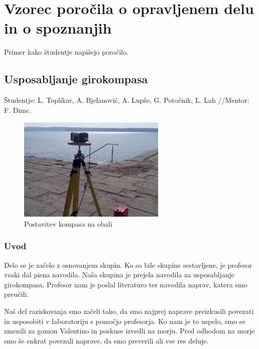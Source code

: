 %
\chapter{Vzorec poročila o opravljenem delu in o spoznanjih}
\label{intro} %

Primer kako študentje napišejo poročilo.

\section{Usposabljanje girokompasa}	
\label{sec:1}
Študentje: L. Toplikar, A. Bjelanović, A. Lupše, G. Potočnik, L. Lah //Mentor: F. Dimc.

\begin{figure}
	\centering
	\includegraphics[height=5cm]{Gyro_obala}
	\caption{Postavitev kompasa na obali}
	\label{fig:Gyro_obala}       %
\end{figure}

\subsection{Uvod}
Delo se je začelo z osnovanjem skupin. Ko so bile skupine sestavljene, je profesor vsaki dal pisna navodila. Naša skupina je prejela navodila za usposabljanje girokompasa. Profesor nam je poslal literaturo ter navodila naprav, katera smo preučili.

Naš del raziskovanja smo začeli tako, da smo najprej naprave preizkusili povezati in usposobiti v laboratoriju s pomočjo profesorja. Ko nam je to uspelo, smo se zmenili za gomon Valentino in poskuse izvedli na morju. Pred odhodom na morje smo še enkrat povezali naprave, da smo preverili ali vse res deluje.

